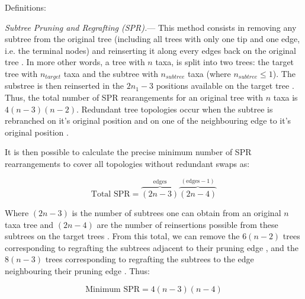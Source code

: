 \documentclass[12pt,letterpaper]{article}
\renewcommand{\subsubsection}[1]{%
\vspace{2ex}
\noindent
\textit{#1.}---}
\begin{document}
Definitions: \cite{allen2001subtree,felsenstein2004inferring}

\subsubsection{Subtree Pruning and Regrafting (SPR)}
This method consists in removing any subtree from the original tree (including all trees with only one tip and one edge, i.e. the terminal nodes) and reinserting it along every edges back on the original tree \citep[see Fig \ref{Figure_Felsenstein};]{felsenstein2004inferring}.
In more other words, a tree with $n$ taxa, is split into two trees: the target tree with $n_{target}$ taxa and the subtree with $n_{subtree}$ taxa (where $n_{subtree} \leq 1$).
The substree is then reinserted in the $2n_{1}-3$ positions available on the target tree \citep{felsenstein2004inferring}.
Thus, the total number of SPR rearangements for an original tree with $n$ taxa is $4(n-3)(n-2)$.
Redundant tree topologies occur when the subtree is rebranched on it's original position and on one of the neighbouring edge to it's original position \citep{allen2001subtree}.

It is then possible to calculate the precise minimum number of SPR rearrangements to cover all topologies without redundant swaps as:

\begin{equation}
    \text{Total SPR}={\overbrace{(2n-3)}^{\text{edges}}} {\overbrace{(2n-4)}^{(\text{edges} - 1)}} %
\end{equation}

Where $(2n-3)$ is the number of subtrees one can obtain from an original $n$ taxa tree and $(2n-4)$ are the number of reinsertions possible from these subtrees on the target trees \cite{allen2001subtree}.
From this total, we can remove the $6(n-2)$ trees corresponding to regrafting the subtrees adjacent to their pruning edge \citep[resulting in the same topology; ][]{allen2001subtree}, and the $8(n-3)$ trees corresponding to regrafting the subtrees to the edge neighbouring their pruning edge \citep{allen2001subtree}.
Thus: 

\begin{equation}
    \text{Minimum SPR}=4(n-3)(n-4) %
\end{equation}

\citep[c.f.][]{felsenstein2004inferring}
\end{document}
